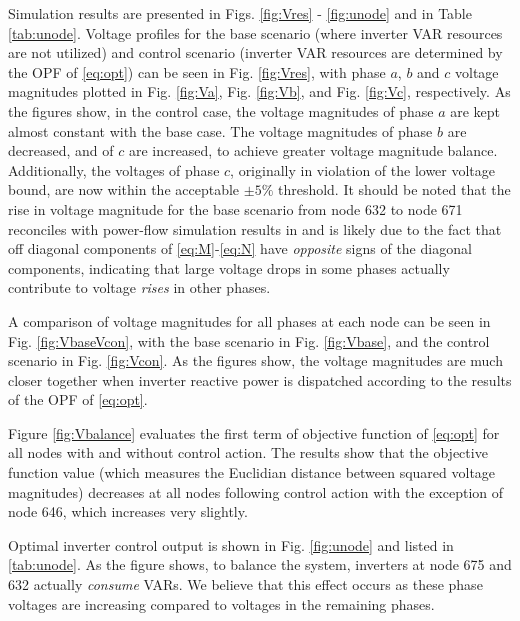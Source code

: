 Simulation results are presented in Figs. \ref{fig:Vres} - \ref{fig:unode} and in Table \ref{tab:unode}.  Voltage profiles for the base scenario (where inverter VAR resources are not utilized) and control scenario (inverter VAR resources are determined by the OPF of \eqref{eq:opt}) can be seen in Fig. \ref{fig:Vres}, with phase $a$, $b$ and $c$ voltage magnitudes plotted in Fig. \ref{fig:Va}, Fig. \ref{fig:Vb}, and Fig. \ref{fig:Vc}, respectively. As the figures show, in the control case, the voltage magnitudes of phase $a$ are kept almost constant with the base case. The voltage magnitudes of phase $b$ are decreased, and of $c$ are increased, to achieve greater voltage magnitude balance. Additionally, the voltages of phase $c$, originally in violation of the lower voltage bound, are now within the acceptable $\pm 5\%$ threshold.  It should be noted that the rise in voltage magnitude for the base scenario from node 632 to node 671 reconciles with power-flow simulation results in \cite{IEEEtestfeeder} and is likely due to the fact that off diagonal components of \eqref{eq:M}-\eqref{eq:N} have \emph{opposite} signs of the diagonal components, indicating that large voltage drops in some phases actually contribute to voltage \emph{rises} in other phases.


A comparison of voltage magnitudes for all phases at each node can be seen in Fig. \ref{fig:VbaseVcon}, with the base scenario in Fig. \ref{fig:Vbase}, and the control scenario in Fig. \ref{fig:Vcon}.  As the figures show, the voltage magnitudes are much closer together when inverter reactive power is dispatched according to the results of the OPF of \eqref{eq:opt}.

Figure \ref{fig:Vbalance} evaluates the first term of objective function of \eqref{eq:opt} for all nodes with and without control action.  The results show that the objective function value (which measures the Euclidian distance between squared voltage magnitudes) decreases at all nodes following control action with the exception of node 646, which increases very slightly.  

Optimal inverter control output is shown in Fig. \ref{fig:unode} and listed in \ref{tab:unode}.  As the figure shows, to balance the system, inverters at node 675 and 632 actually \emph{consume} VARs.  We believe that this effect occurs as these phase voltages are increasing compared to voltages in the remaining phases.

